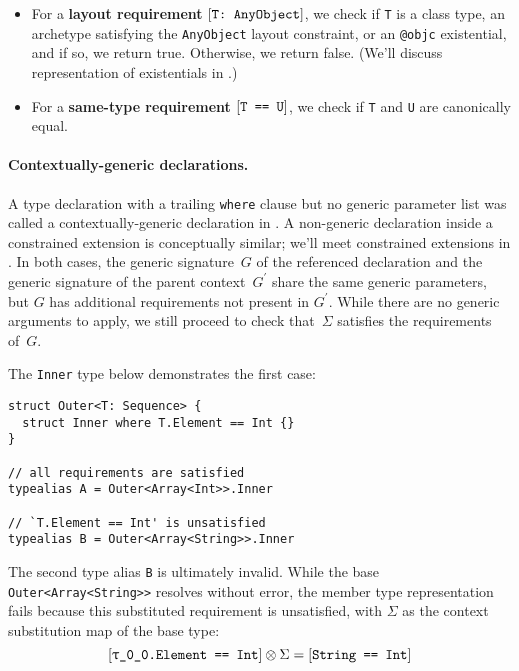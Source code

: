 \documentclass[../generics]{subfiles}
\begin{document}
\begin{algorithm}
\begin{itemize}
\begin{enumerate}
\end{enumerate}
\item For a \textbf{layout requirement} $[\texttt{T:~AnyObject}]$, we check if \texttt{T} is a class type, an archetype satisfying the \texttt{AnyObject} layout constraint, or an \texttt{@objc} existential, and if so, we return true. Otherwise, we return false. (We'll discuss representation of existentials in .)
\item For a \textbf{same-type requirement} $[\texttt{T == U}]$, we check if \texttt{T} and \texttt{U} are canonically equal.
\end{itemize}
\end{algorithm}
\paragraph{Contextually-generic declarations.}
A type declaration with a trailing \texttt{where} clause but no generic parameter list was called a contextually-generic declaration in . A non-generic declaration inside a constrained extension is conceptually similar; we'll meet constrained extensions in . In both cases, the generic signature~$G$ of the referenced declaration and the generic signature of the parent context~$G^\prime$ share the same generic parameters, but $G$ has additional requirements not present in $G^\prime$. While there are no generic arguments to apply, we still proceed to check that~$\Sigma$ satisfies the requirements of~$G$.
\begin{example}
The \texttt{Inner} type below demonstrates the first case:
\begin{Verbatim}
struct Outer<T: Sequence> {
  struct Inner where T.Element == Int {}
}

// all requirements are satisfied
typealias A = Outer<Array<Int>>.Inner

// `T.Element == Int' is unsatisfied
typealias B = Outer<Array<String>>.Inner
\end{Verbatim}
The second type alias \texttt{B} is ultimately invalid. While the base \texttt{Outer<Array<String>>} resolves without error, the member type representation fails because this substituted requirement is unsatisfied, with $\Sigma$ as the context substitution map of the base type:
\[\SameReq{\ttgp{0}{0}.Element}{Int}\otimes\Sigma=\SameReq{String}{Int}\]
\end{example}
\end{document}
